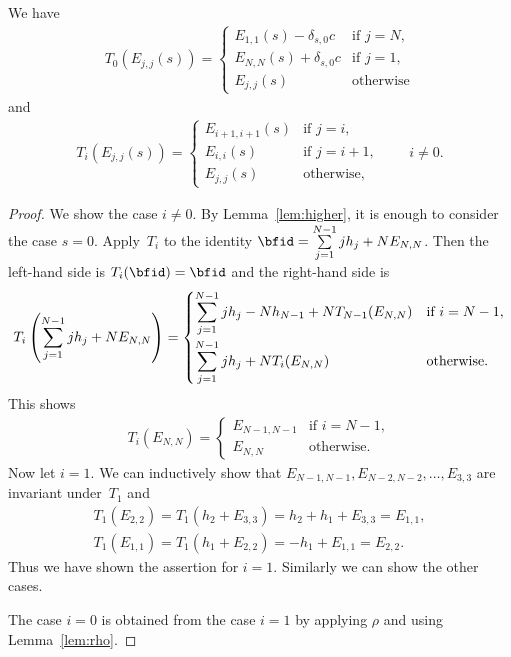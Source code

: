 \begin{lem}\label{lem:diagonal}We have
\begin{gather*}
T_{0}(E_{j,j}(s)) = \begin{cases}
E_{1,1}(s)-\delta_{s,0}c &\text{if } j=N, \\
E_{N,N}(s)+\delta_{s,0}c &\text{if } j=1, \\
E_{j,j}(s) &\text{otherwise}
\end{cases}
\end{gather*}
and
\begin{gather*}
T_{i}(E_{j,j}(s)) = \begin{cases}
E_{i+1,i+1}(s) &\text{if } j=i, \\
E_{i,i}(s) &\text{if } j=i+1,\\
E_{j,j}(s) \ &\text{otherwise},
\end{cases}\qquad i \neq 0.
\end{gather*}
\end{lem}
\begin{proof}We show the case $i \neq 0$. By Lemma~\ref{lem:higher}, it is enough to consider the case $s=0$. Apply~$T_i$ to the identity $\bfid = \sum\limits_{j=1}^{N-1} j h_j + N E_{N,N}$. Then the left-hand side is $T_i(\bfid) = \bfid$ and the right-hand side is
\begin{gather*}
T_i \left(\sum_{j=1}^{N-1} j h_j + N E_{N,N}\right) = \begin{cases}
\displaystyle\sum_{j=1}^{N-1} j h_j - N h_{N-1} + N T_{N-1}(E_{N,N}) & \text{if $i = N-1$}, \vspace{1mm}\\
\displaystyle\sum_{j=1}^{N-1} j h_j + N T_i(E_{N,N}) & \text{otherwise}.
\end{cases}
\end{gather*}
This shows
\begin{gather*}
T_i (E_{N,N}) = \begin{cases}
E_{N-1,N-1} & \text{if $i = N-1$}, \\
E_{N,N} & \text{otherwise}.
\end{cases}
\end{gather*}
Now let $i=1$. We can inductively show that $E_{N-1,N-1}, E_{N-2,N-2}, \ldots, E_{3,3}$ are invariant under~$T_1$ and
\begin{gather*}
T_1(E_{2,2}) = T_1(h_2 + E_{3,3}) = h_2 + h_1 + E_{3,3} = E_{1,1},\\
T_1(E_{1,1}) = T_1(h_1 + E_{2,2}) = -h_1 + E_{1,1} = E_{2,2}.
\end{gather*}
Thus we have shown the assertion for $i=1$. Similarly we can show the other cases.

The case $i=0$ is obtained from the case $i=1$ by applying $\rho$ and using Lemma~\ref{lem:rho}.
\end{proof}

